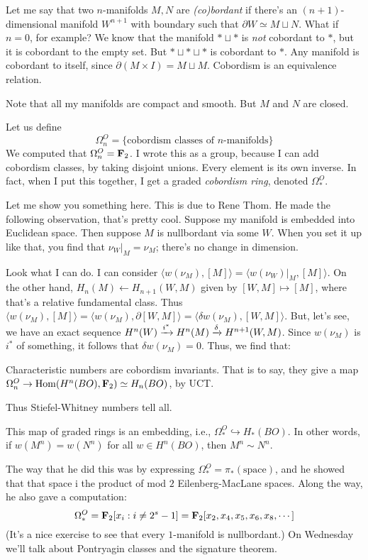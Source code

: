 Let me say that two $n$-manifolds $M, N$ are \emph{(co)bordant} if there's an $(n+1)$-dimensional manifold $W^{n+1}$ with boundary such that $\partial W\simeq M\sqcup N$.
What if $n=0$, for example?
We know that the manifold $\ast\sqcup \ast$ is \emph{not} cobordant to $\ast$, but it is cobordant to the empty set.
But $\ast\sqcup\ast\sqcup\ast$ is cobordant to $\ast$.
Any manifold is cobordant to itself, since $\partial(M\times I) = M\sqcup M$.
Cobordism is an equivalence relation.

Note that all my manifolds are compact and smooth.
But $M$ and $N$ are closed.

Let us define
$$
\Omega^O_n = \{\text{cobordism classes of $n$-manifolds}\}
$$
We computed that $\Omega^O_n = \mathbf F_2$.
I wrote this as a group, because I can add cobordism classes, by taking disjoint unions.
Every element is its own inverse.
In fact, when I put this together, I get a graded \emph{cobordism ring}, denoted $\Omega^O_\ast$.

Let me show you something here.
This is due to Rene Thom.
He made the following observation, that's pretty cool.
Suppose my manifold is embedded into Euclidean space.
Then suppose $M$ is nullbordant via some $W$.
When you set it up like that, you find that $\nu_W|_{M} = \nu_M$; there's no change in dimension.

Look what I can do.
I can consider $\langle w(\nu_M),[M]\rangle = \langle w(\nu_W)|_{M},[M]\rangle$.
On the other hand, $H_n(M) \leftarrow H_{n+1}(W,M)$ given by $[W,M]\mapsto[M]$, where that's a relative fundamental class.
Thus $\langle w(\nu_M),[M]\rangle = \langle w(\nu_M),\partial[W,M]\rangle = \langle \delta w(\nu_M),[W,M]\rangle$.
But, let's see, we have an exact sequence $H^n(W)\xrightarrow{{i^\ast}} H^n(M) \xrightarrow{{\delta}} H^{n+1}(W,M)$.
Since $w(\nu_M)$ is $i^\ast$ of something, it follows that $\delta w(\nu_M) = 0$.
Thus, we find that:
\begin{prop}
    Characteristic numbers are cobordism invariants.
    That is to say, they give a map $\Omega^O_n \to \operatorname{Hom}(H^n(BO),\mathbf F_2)\simeq H_n(BO)$, by UCT.
\end{prop}
Thus Stiefel-Whitney numbers tell all.
\begin{theorem}[Thom, 1954]
    This map of graded rings is an embedding, i.e., $\Omega^O_\ast \hookrightarrow H_\ast(BO)$.
    In other words, if $w(M^n) = w(N^n)$ for all $w\in H^n(BO)$, then $M^n \sim N^n$.
\end{theorem}
The way that he did this was by expressing $\Omega^O_\ast = \pi_\ast(\text{space})$, and he showed that that space i the product of mod $2$ Eilenberg-MacLane spaces.
Along the way, he also gave a computation:
$$
\Omega^O_\ast = \mathbf F_2[x_i:i\neq 2^s-1] = \mathbf F_2[x_2,x_4,x_5,x_6,x_8,\cdots]
$$
(It's a nice exercise to see that every $1$-manifold is nullbordant.)
On Wednesday we'll talk about Pontryagin classes and the signature theorem.
